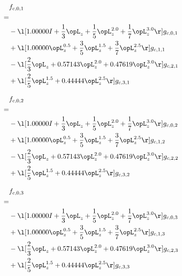 \begin{alignat}{2} 
\label{eq:f_01_0} 
& f_{c,0,1} \nonumber \\ 
 = \\ 
& - \l[  1.00000 I + \frac{1}{3} \opL_z + \frac{1}{5} \opL_z^{2.0} + \frac{1}{7} \opL_z^{3.0}  \r] g_{c,0,1} \nonumber \\ 
& + \l[  1.00000 \opL_z^{0.5} + \frac{3}{5} \opL_z^{1.5} + \frac{3}{7} \opL_z^{2.5}  \r] g_{c,1,1} \nonumber \\ 
& - \l[ \frac{2}{3} \opL_z +  0.57143 \opL_z^{2.0} +  0.47619 \opL_z^{3.0}  \r] g_{c,2,1} \nonumber \\ 
& + \l[ \frac{2}{5} \opL_z^{1.5} +  0.44444 \opL_z^{2.5}  \r] g_{c,3,1} \nonumber \\ 
\end{alignat} 


\begin{alignat}{2} 
\label{eq:f_02_0} 
& f_{c,0,2} \nonumber \\ 
 = \\ 
& - \l[  1.00000 I + \frac{1}{3} \opL_z + \frac{1}{5} \opL_z^{2.0} + \frac{1}{7} \opL_z^{3.0}  \r] g_{c,0,2} \nonumber \\ 
& + \l[  1.00000 \opL_z^{0.5} + \frac{3}{5} \opL_z^{1.5} + \frac{3}{7} \opL_z^{2.5}  \r] g_{c,1,2} \nonumber \\ 
& - \l[ \frac{2}{3} \opL_z +  0.57143 \opL_z^{2.0} +  0.47619 \opL_z^{3.0}  \r] g_{c,2,2} \nonumber \\ 
& + \l[ \frac{2}{5} \opL_z^{1.5} +  0.44444 \opL_z^{2.5}  \r] g_{c,3,2} \nonumber \\ 
\end{alignat} 


\begin{alignat}{2} 
\label{eq:f_03_0} 
& f_{c,0,3} \nonumber \\ 
 = \\ 
& - \l[  1.00000 I + \frac{1}{3} \opL_z + \frac{1}{5} \opL_z^{2.0} + \frac{1}{7} \opL_z^{3.0}  \r] g_{c,0,3} \nonumber \\ 
& + \l[  1.00000 \opL_z^{0.5} + \frac{3}{5} \opL_z^{1.5} + \frac{3}{7} \opL_z^{2.5}  \r] g_{c,1,3} \nonumber \\ 
& - \l[ \frac{2}{3} \opL_z +  0.57143 \opL_z^{2.0} +  0.47619 \opL_z^{3.0}  \r] g_{c,2,3} \nonumber \\ 
& + \l[ \frac{2}{5} \opL_z^{1.5} +  0.44444 \opL_z^{2.5}  \r] g_{c,3,3} \nonumber \\ 
\end{alignat} 


